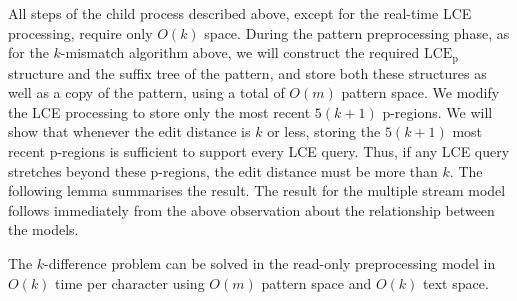 \documentclass[envcountsame]{llncs}
\newcommand{\pregions}{\mbox{p-regions}\xspace}
\newcommand{\LCEP}{\ensuremath{\text{LCE}_\text{p}}\xspace}
\begin{document}
All steps of the child process described above, except for the real-time LCE processing, require only $O(k)$ space. During the pattern preprocessing phase, as for the $k$-mismatch algorithm above, we will construct the required $\LCEP$ structure and the suffix tree of the pattern, and store both these structures as well as a copy of the pattern, using a total of $O(m)$ pattern space.
We modify the LCE processing to store only the most recent $5(k+1)$ \pregions.
We will show that whenever the edit distance is $k$ or less, storing the $5(k+1)$ most recent \pregions is sufficient to support every LCE query. Thus, if any LCE query stretches beyond these \pregions, the edit distance must be more than $k$. The following lemma summarises the result. The result for the multiple stream model follows immediately from the above observation about the relationship between the models.



\begin{lemma}
    \label{lem:k-diff}
    The $k$-difference problem can be solved in the read-only
    preprocessing model in  $O(k)$ time per character using $O(m)$ pattern space and $O(k)$ text space.
\end{lemma}
\end{document}

